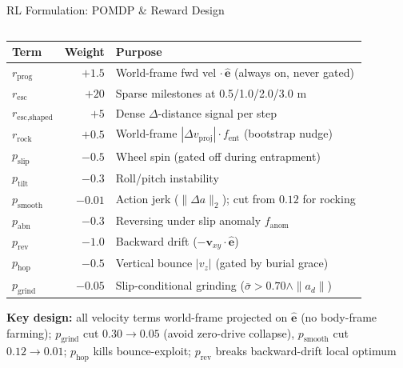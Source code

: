 \documentclass[aspectratio=169, 10pt]{beamer}
\begin{document}
\begin{frame}{RL Formulation: POMDP \& Reward Design}
\begin{columns}[T]
  \begin{tcolorbox}[mycard, title={\faBalanceScale\; Reward Function $R_t$ (9-term, current)}]
  \vspace{2pt}
  {\tiny
  \begin{tabularx}{\linewidth}{@{}l r X@{}}
    \toprule
    \rowcolor{MarsRust!8}
    \color{StarWhite}\textbf{Term} &
    \color{StarWhite}\textbf{Weight} &
    \color{StarWhite}\textbf{Purpose} \\
    \midrule
    \rowcolor{AccentGreen!8}
    $r_\text{prog}$ & $+1.5$ & World-frame fwd vel $\cdot\,\hat{\mathbf{e}}$ (always on, never gated) \\
    \rowcolor{AccentGreen!8}
    $r_\text{esc}$   & $+20$  & Sparse milestones at 0.5/1.0/2.0/3.0 m \\
    \rowcolor{AccentGreen!8}
    $r_\text{esc,shaped}$ & $+5$ & Dense $\Delta$-distance signal per step \\
    \rowcolor{AccentGreen!8}
    $r_\text{rock}$  & $+0.5$ & World-frame $|\Delta v_\text{proj}| \cdot f_\text{ent}$ (bootstrap nudge) \\
    \midrule
    \rowcolor{MarsRust!5}
    $p_\text{slip}$     & $-0.5$ & Wheel spin (gated off during entrapment) \\
    \rowcolor{MarsRust!5}
    $p_\text{tilt}$     & $-0.3$ & Roll/pitch instability \\
    \rowcolor{MarsRust!5}
    $p_\text{smooth}$   & $-0.01$ & Action jerk ($\|\Delta a\|_2$); cut from $0.12$ for rocking \\
    \rowcolor{MarsRust!5}
    $p_\text{abn}$      & $-0.3$ & Reversing under slip anomaly $f_\text{anom}$ \\
    \rowcolor{MarsRust!5}
    $p_\text{rev}$      & $-1.0$ & Backward drift ($-\mathbf{v}_{xy}\!\cdot\!\hat{\mathbf{e}}$) \\
    \rowcolor{MarsRust!5}
    $p_\text{hop}$      & $-0.5$ & Vertical bounce $|v_z|$ (gated by burial grace) \\
    \rowcolor{MarsRust!5}
    $p_\text{grind}$    & $-0.05$ & Slip-conditional grinding ($\bar\sigma{>}0.70 \wedge \|a_d\|$) \\
    \bottomrule
  \end{tabularx}
  }
  \vspace{3pt}
  \begin{tcolorbox}[highlight]
    \tiny\centering
    \textbf{Key design:} all velocity terms world-frame projected on $\hat{\mathbf{e}}$ (no body-frame farming);
    $p_\text{grind}$ cut $0.30{\to}0.05$ (avoid zero-drive collapse), $p_\text{smooth}$ cut $0.12{\to}0.01$;
    $p_\text{hop}$ kills bounce-exploit; $p_\text{rev}$ breaks backward-drift local optimum
  \end{tcolorbox}
  \end{tcolorbox}
\end{columns}
\end{frame}
\end{document}
